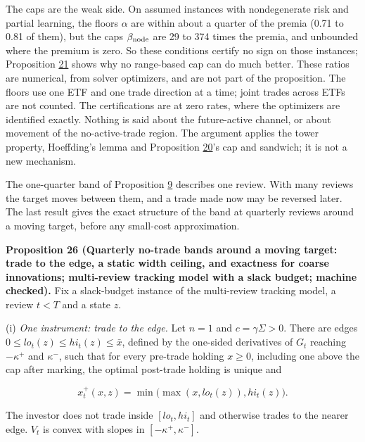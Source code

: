 \documentclass[11pt]{article}
\begin{document}
The caps are the weak side. On assumed instances with nondegenerate
risk and partial learning, the floors \(\alpha\) are within about a
quarter of the premia (0.71 to 0.81 of them), but the caps
\(\beta_{\rm node}\) are 29 to 374 times the premia, and unbounded where
the premium is zero. So these conditions certify no sign on those
instances; Proposition \hyperref[res:Proposition-21]{21} shows why no range-based cap can do much
better. These ratios are numerical, from solver optimizers, and are
not part of the proposition. The floors use one ETF and one trade
direction at a time; joint trades across ETFs are not counted. The
certifications are at zero rates, where the optimizers are
identified exactly. Nothing is said about the future-active channel,
or about movement of the no-active-trade region. The argument
applies the tower property, Hoeffding's lemma and Proposition \hyperref[res:Proposition-20]{20}'s
cap and sandwich; it is not a new mechanism.

The one-quarter band of Proposition \hyperref[res:Proposition-9]{9} describes one review. With many
reviews the target moves between them, and a trade made now may be
reversed later. The last result gives the exact structure of the
band at quarterly reviews around a moving target, before any
small-cost approximation.

\label{res:Proposition-26}
\textbf{Proposition 26 (Quarterly no-trade bands around a moving target: trade to the edge, a static width ceiling, and exactness for coarse innovations; multi-review tracking model with a slack budget; machine checked).}
Fix a slack-budget instance of the multi-review tracking model, a
review \(t<T\) and a state \(z\).

(i) \emph{One instrument: trade to the edge.} Let \(n=1\) and
\(c=\gamma\Sigma>0\). There are edges
\(0\leq lo_t(z)\leq hi_t(z)\leq\bar x\), defined by the one-sided
derivatives of \(G_t\) reaching \(-\kappa^+\) and \(\kappa^-\), such that
for every pre-trade holding \(x\geq0\), including one above the cap
after marking, the optimal post-trade holding is unique and

\begin{equation*}
x^+_t(x,z)=\min\bigl(\max(x,lo_t(z)),hi_t(z)\bigr).\tag{79}\label{eq:79}
\end{equation*}

The investor does not trade inside \([lo_t,hi_t]\) and otherwise trades
to the nearer edge. \(V_t\) is convex with slopes in \([-\kappa^+,\kappa^-]\).
\end{document}
